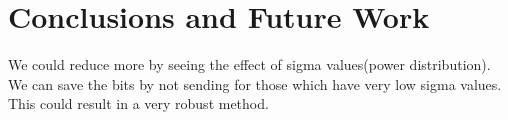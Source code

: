 \documentclass[conference]{IEEEtran}
\begin{document}

\section{Conclusions and Future Work}
\label{section4}

We could reduce more by seeing the effect of sigma values(power distribution). We can save the bits by not sending for those which have very low sigma values. This could result in a very robust method.

\vspace{-4pt}



\renewcommand{\bibfont}{\footnotesize}


\end{document}
